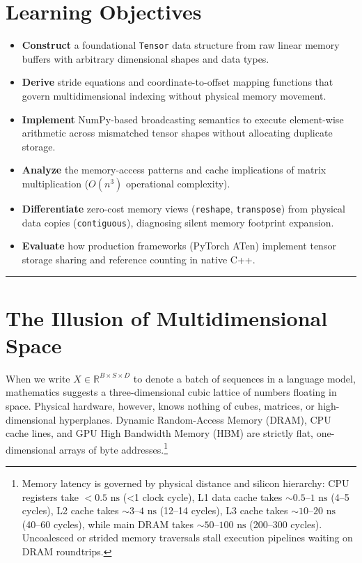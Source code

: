 \documentclass[
  letterpaper,
]{scrbook}
\providecommand{\tightlist}{%
  \setlength{\itemsep}{0pt}\setlength{\parskip}{0pt}}
\begin{document}
\section{Learning Objectives}\label{learning-objectives-1}

\begin{itemize}
\tightlist
\item
  \textbf{Construct} a foundational \texttt{Tensor} data structure from
  raw linear memory buffers with arbitrary dimensional shapes and data
  types.
\item
  \textbf{Derive} stride equations and coordinate-to-offset mapping
  functions that govern multidimensional indexing without physical
  memory movement.
\item
  \textbf{Implement} NumPy-based broadcasting semantics to execute
  element-wise arithmetic across mismatched tensor shapes without
  allocating duplicate storage.
\item
  \textbf{Analyze} the memory-access patterns and cache implications of
  matrix multiplication (\(O(n^3)\) operational complexity).
\item
  \textbf{Differentiate} zero-cost memory views (\texttt{reshape},
  \texttt{transpose}) from physical data copies (\texttt{contiguous}),
  diagnosing silent memory footprint expansion.
\item
  \textbf{Evaluate} how production frameworks (PyTorch ATen) implement
  tensor storage sharing and reference counting in native C++.
\end{itemize}

\begin{center}\rule{0.5\linewidth}{0.5pt}\end{center}

\section{The Illusion of Multidimensional
Space}\label{the-illusion-of-multidimensional-space}

When we write \(X \in \mathbb{R}^{B \times S \times D}\) to denote a
batch of sequences in a language model, mathematics suggests a
three-dimensional cubic lattice of numbers floating in space. Physical
hardware, however, knows nothing of cubes, matrices, or high-dimensional
hyperplanes. Dynamic Random-Access Memory (DRAM), CPU cache lines, and
GPU High Bandwidth Memory (HBM) are strictly flat, one-dimensional
arrays of byte addresses.\footnote{Memory latency is governed by
  physical distance and silicon hierarchy: CPU registers take
  \(<0.5\text{ ns}\) (\textless1 clock cycle), L1 data cache takes
  \(\sim 0.5\text{--}1\text{ ns}\) (4--5 cycles), L2 cache takes
  \(\sim 3\text{--}4\text{ ns}\) (12--14 cycles), L3 cache takes
  \(\sim 10\text{--}20\text{ ns}\) (40--60 cycles), while main DRAM
  takes \(\sim 50\text{--}100\text{ ns}\) (200--300 cycles). Uncoalesced
  or strided memory traversals stall execution pipelines waiting on DRAM
  roundtrips.}
\end{document}
